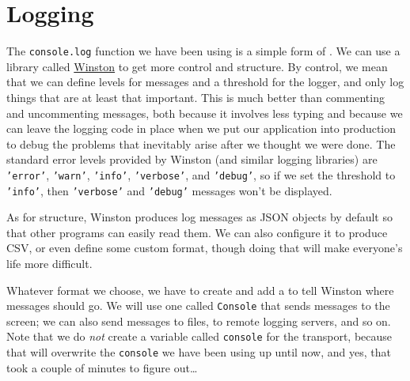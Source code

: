 \chapter{Logging}\label{s:logging}

The \texttt{console.log} function we have been using
is a simple form of .
We can use a library called \href{https://github.com/winstonjs/winston}{Winston} to get more control and structure.
By control,
we mean that we can define levels for messages and a threshold for the logger,
and only log things that are at least that important.
This is much better than commenting and uncommenting messages,
both because it involves less typing
and because we can leave the logging code in place when we put our application into production
to debug the problems that inevitably arise after we thought we were done.
The standard error levels provided by Winston (and similar logging libraries)
are \texttt{'error'}, \texttt{'warn'}, \texttt{'info'}, \texttt{'verbose'}, and \texttt{'debug'},
so if we set the threshold to \texttt{'info'},
then \texttt{'verbose'} and \texttt{'debug'} messages won't be displayed.

As for structure,
Winston produces log messages as JSON objects by default
so that other programs can easily read them.
We can also configure it to produce CSV,
or even define some custom format,
though doing that will make everyone's life more difficult.

Whatever format we choose,
we have to create and add a  to tell Winston where messages should go.
We will use one called \texttt{Console} that sends messages to the screen;
we can also send messages to files, to remote logging servers, and so on.
Note that we do \emph{not} create a variable called \texttt{console} for the transport,
because that will overwrite the \texttt{console} we have been using up until now,
and yes, that took a couple of minutes to figure out\ldots{}

